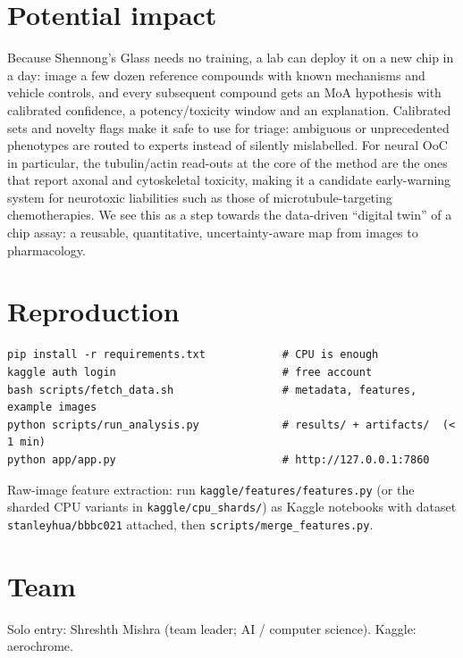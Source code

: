 \documentclass[11pt,a4paper]{article}
\newcommand{\TeamDetails}{Solo entry: Shreshth Mishra (team leader; AI / computer science). Kaggle: aerochrome.}
\begin{document}
\section{Potential impact}
Because Shennong's Glass needs no training, a lab can deploy it on a new chip in a day: image a few dozen
reference compounds with known mechanisms and vehicle controls, and every subsequent compound
gets an MoA hypothesis with calibrated confidence, a potency/toxicity window and an
explanation. Calibrated sets and novelty flags make it safe to use for triage: ambiguous or
unprecedented phenotypes are routed to experts instead of silently mislabelled. For neural OoC in
particular, the tubulin/actin read-outs at the core of the method are the ones that report
axonal and cytoskeletal toxicity, making it a candidate early-warning system for
neurotoxic liabilities such as those of microtubule-targeting chemotherapies. We see this as a
step towards the data-driven ``digital twin'' of a chip assay: a reusable, quantitative,
uncertainty-aware map from images to pharmacology.

\section{Reproduction}
\begin{verbatim}
pip install -r requirements.txt            # CPU is enough
kaggle auth login                          # free account
bash scripts/fetch_data.sh                 # metadata, features, example images
python scripts/run_analysis.py             # results/ + artifacts/  (< 1 min)
python app/app.py                          # http://127.0.0.1:7860
\end{verbatim}
Raw-image feature extraction: run \texttt{kaggle/features/features.py} (or the sharded CPU
variants in \texttt{kaggle/cpu\_shards/}) as Kaggle notebooks with dataset
\texttt{stanleyhua/bbbc021} attached, then \texttt{scripts/merge\_features.py}.

\section*{Team}
\TeamDetails
\end{document}
